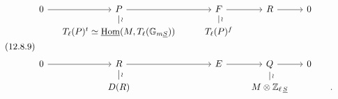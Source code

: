 \begin{equation}\tag{12.8.9}
\begin{tikzcd}[row sep=small, column sep=small]
0 \arrow[r] & P \arrow[rr] \arrow[d, dash, "\wr"] & & F \arrow[r] \arrow[d, dash, "\wr"] & R \arrow[r] & 0 & \\
& T_\ell(P)^t \simeq \underline{\mathrm{Hom}}(M,T_\ell(\mathbb{G}_{m\underline{S}})) & & T_\ell(P)^f & & & \\
& & & & & & \\
0 \arrow[r] & R \arrow[rr] \arrow[d, dash, "\wr"] & & E \arrow[r] & Q \arrow[r] \arrow[d, dash, "\wr"] & 0 & \\
& D(R) & & & M \otimes \mathbb{Z}_{\ell\,\underline{S}} & & .
\end{tikzcd}
\end{equation}

